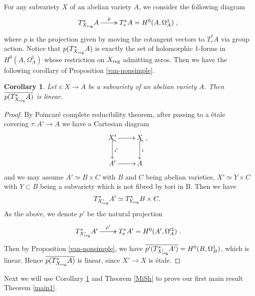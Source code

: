 \documentclass[a4paper,12pt,reqno]{amsart}
\theoremstyle{plain}
\newtheorem{corollary}[theorem]{Corollary}
\theoremstyle{remark}
\renewcommand{\cong}{\simeq}
\begin{document}
For any subvariety $X$ of an abelian variety $A$, we consider the following diagram 
$$\xymatrix{
T^*_{X_{\textnormal{reg}}}A\ar@{->>}[r]^-p& T^*_e A=H^0(A, \Omega_A^1)
},$$ where $p$ is the projection given by moving the cotangent vectors to $T^*_eA$ via group action. Notice that $p(T^*_{X_{\textnormal{reg}}}A)$ is exactly the set of holomorphic 1-forms in $H^0(A, \Omega_A^1)$ whose restriction on $X_{\textnormal{reg}}$ admitting zeros. Then we have the following corollary of Proposition \ref{van-nonsimple}.

\begin{corollary}\label{Main-coro}
Let $i: X\to A$ be a subvariety of an abelian variety $A$. Then $\overline{p(T^*_{X_{\textnormal{reg}}}A)}$ is linear. 
\end{corollary}


\begin{proof}
By Poincar\'e complete reducibility theorem, after passing to a \'etale covering $\tau:A'\to A$ we have a Cartesian diagram 
$$\xymatrix{
X'\ar[r]\ar@{^{(}->}[d]^-{i'}& X\ar@{^{(}->}[d]^-{i}\\
A'\ar[r]& A},$$ and we may assume $A'\cong B\times C$ with $B$ and $C$ being abelian varieties, $X'\cong Y\times C$ with $Y\subset B$ being a subvariety which is not fibred by tori in B. Then we have $$T^*_{X'_{\textnormal{reg}}}A'\cong T^*_{Y_{\textnormal{reg}}}B\times C.$$ As the above, we denote $p'$ be the natural projection $$\xymatrix{
T^*_{X'_{\textnormal{reg}}}A'\ar@{->>}[r]^-{p'}& T^*_e A'=H^0(A', \Omega_A'^1)
}.$$  Then by Proposition \ref{van-nonsimple}, we have $\overline{p'(T^*_{X'_{\textnormal{reg}}}A')}=H^0(B, \Omega_B^1)$, which is linear. Hence $\overline{p(T^*_{X_{\textnormal{reg}}}A)}$ is linear, since $X'\to X$ is \'etale.
\end{proof}

Next we will use Corollary \ref{Main-coro} and Theorem \ref{MiSh} to prove our first main result Theorem \ref{main1}.
\end{document}
